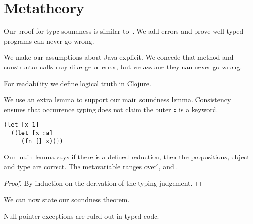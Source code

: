 \section{Metatheory}

Our proof for type soundness is similar to~\cite{TF10}. We add
errors and prove well-typed programs can never go wrong.

We make our assumptions about Java explicit. We concede that
method and constructor calls may diverge or error, but we assume they can
never go wrong.

{\javaassumptionsall}

For readability we define logical truth in Clojure.

{\istruefalsedefinitions}

We use an extra lemma to support our main soundness lemma. Consistency
ensures that occurrence typing does not claim the outer 
\texttt{x} is a keyword. 

\begin{verbatim}
(let [x 1]
  ((let [x :a]
     (fn [] x))))
\end{verbatim}

{\consistentwithdefinition}

Our main lemma says if there is a defined reduction, then the propositions, object
and type are correct.
The metavariable  ranges over \v{}, \errorvalv{} and \wrong{}.

\begin{lemma}\label{lemma:soundness}

  {\soundnesslemmahypothesis}
  \begin{proof}
    By induction on the derivation of the typing judgement.
  \end{proof}
\end{lemma}


We can now state our soundness theorem.

{\soundnesstheorem}

{\wrongtheorem}

Null-pointer exceptions are ruled-out in typed code.

{\nilinvoketheorem}
